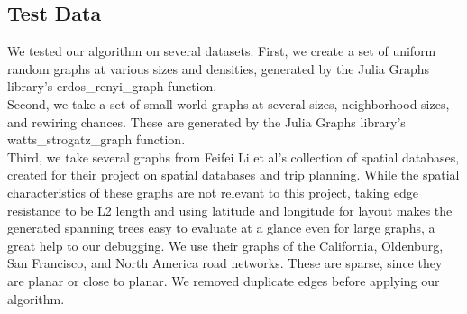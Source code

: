 \documentclass{article}
\begin{document}
\subsection*{Test Data}
We tested our algorithm on several datasets.  First, we create a set of uniform random graphs at various sizes and densities, generated by the Julia Graphs library's erdos\_renyi\_graph function.\\
Second, we take a set of small world graphs at several sizes, neighborhood sizes, and rewiring chances.  These are generated by the Julia Graphs library's watts\_strogatz\_graph function.\\
Third, we take several graphs from Feifei Li et al's collection of spatial databases\cite{feifei-data}, created for their project on spatial databases and trip planning\cite{feifei-paper}.  While the spatial characteristics of these graphs are not relevant to this project, taking edge resistance to be L2 length and using latitude and longitude for layout makes the generated spanning trees easy to evaluate at a glance even for large graphs, a great help to our debugging.  We use their graphs of the California, Oldenburg, San Francisco, and North America road networks.  These are sparse, since they are planar or close to planar.  We removed duplicate edges before applying our algorithm.  
\end{document}
